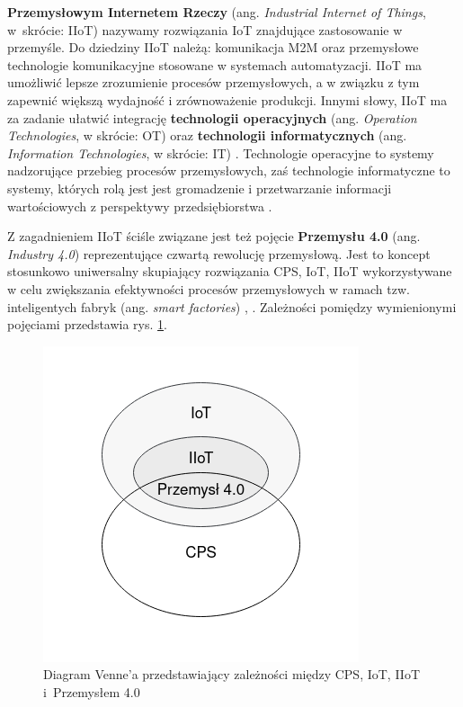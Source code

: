 \documentclass[a4paper, 12pt, twoside]{article}
\begin{document}
\textbf{Przemysłowym Internetem Rzeczy} (ang. \emph{Industrial Internet of Things}, w~skrócie: IIoT)
nazywamy rozwiązania IoT znajdujące zastosowanie w przemyśle. Do dziedziny
IIoT należą: komunikacja M2M oraz przemysłowe technologie komunikacyjne stosowane
w systemach automatyzacji. IIoT ma umożliwić lepsze zrozumienie procesów
przemysłowych, a w związku z tym zapewnić większą wydajność i zrównoważenie
produkcji. Innymi słowy, IIoT ma za zadanie ułatwić integrację \textbf{technologii operacyjnych}
(ang. \emph{Operation Technologies}, w skrócie: OT) oraz
\textbf{technologii informatycznych} (ang. \emph{Information Technologies}, w skrócie: IT)
\cite{iiot-challenges-opportunities-directions}.
Technologie operacyjne to systemy nadzorujące przebieg procesów przemysłowych,
zaś technologie informatyczne to systemy, których rolą jest jest gromadzenie
i przetwarzanie informacji wartościowych z perspektywy przedsiębiorstwa
\cite{ot-it-categorization-of-customer-concerns}.

Z zagadnieniem IIoT ściśle związane jest też pojęcie \textbf{Przemysłu 4.0} (ang. \emph{Industry 4.0})
reprezentujące czwartą rewolucję przemysłową. Jest to koncept stosunkowo uniwersalny
skupiający rozwiązania CPS, IoT, IIoT wykorzystywane w celu zwiększania efektywności
procesów przemysłowych w ramach tzw. inteligentych fabryk (ang. \emph{smart factories})
\cite{iiot-cyber-manufacturing-systems}, \cite{iiot-challenges-opportunities-directions}.
Zależności pomiędzy wymienionymi pojęciami przedstawia rys. \ref{fig:venn}.

\begin{figure}[h]
    \centering
    \includegraphics[scale=0.55]{Venn.png}
    \caption{Diagram Venne'a przedstawiający zależności między CPS, IoT, IIoT i~Przemysłem 4.0}
    \label{fig:venn}
\end{figure}
\end{document}
